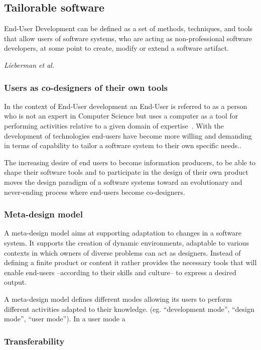 \subsection{Tailorable software}

\epigraph{End-User Development can be defined as a set of methods, techniques, and tools that allow users of software systems, who are acting as non-professional software developers, at some point to create, modify or extend a software artifact.
}{\textit{Lieberman et al.\cite{lieberman2006}}}

\subsubsection{Users as co-designers of their own tools}

In the context of End-User development an End-User is referred to as a person who is not an expert in Computer Science but uses a computer as a tool for performing activities relative to a given domain of expertise~\cite{lieberman2006}. With the development of technologies end-users have become more willing and demanding in terms of capability to tailor a software system to their own specific needs.\cite{Nardi1993}.

The increasing desire of end users to become information producers, to be able to shape their software tools and to participate in the design of their own product moves the design paradigm of a software systems toward an evolutionary and never-ending process where end-users become co-designers.\cite{Carmelo2011}

\subsubsection{Meta-design model}

A meta-design model aims at supporting adaptation to changes in a software system. It supports the creation of dynamic environments, adaptable to various contexts in which owners of diverse problems can act as designers. Instead of defining a finite product or content it rather provides the necessary tools that will enable end-users --according to their skills and culture-- to express a desired output.

A meta-design model defines different modes allowing its users to perform different activities adapted to their knowledge. (eg.  ``development mode'', ``design mode'', ``user mode''). In a user mode a 


\subsubsection{Transferability}

